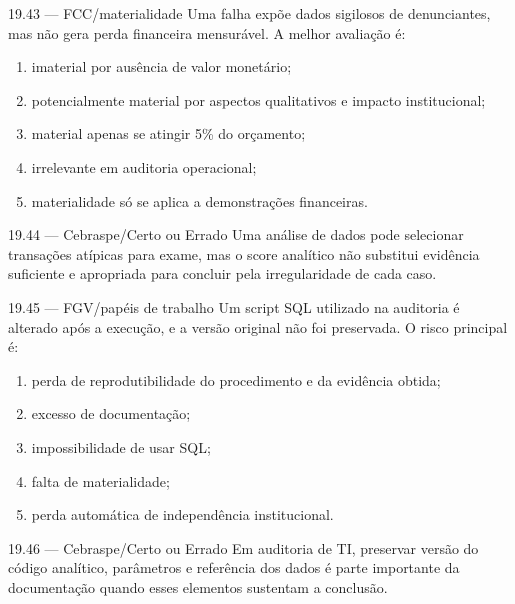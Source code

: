 \begin{questao}{ 19.43 — FCC/materialidade}
Uma falha expõe dados sigilosos de denunciantes, mas não gera perda financeira mensurável. A melhor avaliação é:
\begin{enumerate}[label=\Alph*)]
\item imaterial por ausência de valor monetário;
\item potencialmente material por aspectos qualitativos e impacto institucional;
\item material apenas se atingir 5\% do orçamento;
\item irrelevante em auditoria operacional;
\item materialidade só se aplica a demonstrações financeiras.
\end{enumerate}
\end{questao}

\begin{questao}{ 19.44 — Cebraspe/Certo ou Errado}
Uma análise de dados pode selecionar transações atípicas para exame, mas o score analítico não substitui evidência suficiente e apropriada para concluir pela irregularidade de cada caso.
\end{questao}

\begin{questao}{ 19.45 — FGV/papéis de trabalho}
Um script SQL utilizado na auditoria é alterado após a execução, e a versão original não foi preservada. O risco principal é:
\begin{enumerate}[label=\Alph*)]
\item perda de reprodutibilidade do procedimento e da evidência obtida;
\item excesso de documentação;
\item impossibilidade de usar SQL;
\item falta de materialidade;
\item perda automática de independência institucional.
\end{enumerate}
\end{questao}

\begin{questao}{ 19.46 — Cebraspe/Certo ou Errado}
Em auditoria de TI, preservar versão do código analítico, parâmetros e referência dos dados é parte importante da documentação quando esses elementos sustentam a conclusão.
\end{questao}

